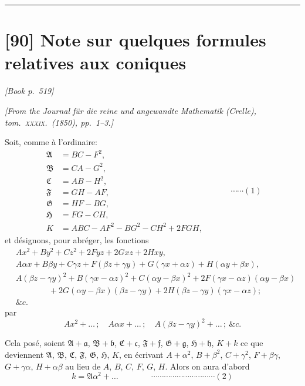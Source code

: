 \documentclass[11pt]{article}
\begin{document}
\bigskip
\hrule
\bigskip


\section*{[90] Note sur quelques formules relatives aux coniques}

\noindent\textit{[Book p.~519]}\hfill

\smallskip

\noindent\emph{[From the Journal f\"ur die reine und angewandte Mathematik (Crelle), tom.~\textsc{xxxix}.\ (1850), pp.~1--3.]}

\medskip

\noindent Soit, comme \`a l'ordinaire:
\[
\begin{aligned}
\mathfrak{A} &= B C - F^{2},\\
\mathfrak{B} &= C A - G^{2},\\
\mathfrak{C} &= A B - H^{2},\\
\mathfrak{F} &= G H - A F,\\
\mathfrak{G} &= H F - B G,\\
\mathfrak{H} &= F G - C H,\\
K &= A B C - A F^{2} - B G^{2} - C H^{2} + 2 F G H,
\end{aligned}\qquad\quad\cdots\cdots (1)
\]
et d\'esignons, pour abr\'eger, les fonctions
\[
\begin{aligned}
& A x^{2} + B y^{2} + C z^{2} + 2 F y z + 2 G x z + 2 H x y,\\
& A \alpha x + B \beta y + C \gamma z + F(\beta z + \gamma y) + G(\gamma x + \alpha z) + H(\alpha y + \beta x),\\
& A(\beta z - \gamma y)^{2} + B(\gamma x - \alpha z)^{2} + C(\alpha y - \beta x)^{2} + 2 F(\gamma x - \alpha z)(\alpha y - \beta x)\\
& \qquad\qquad + 2 G(\alpha y - \beta x)(\beta z - \gamma y) + 2 H(\beta z - \gamma y)(\gamma x - \alpha z);\\
& \&c.
\end{aligned}
\]
par
\[
A x^{2} + \dots\,;\quad A \alpha x + \dots\,;\quad A(\beta z - \gamma y)^{2} + \dots\,;\ \&c.
\]

Cela pos\'e, soient $\mathfrak{A} + \mathfrak{a}$, $\mathfrak{B} + \mathfrak{b}$, $\mathfrak{C} + \mathfrak{c}$, $\mathfrak{F} + \mathfrak{f}$, $\mathfrak{G} + \mathfrak{g}$, $\mathfrak{H} + \mathfrak{h}$, $K + k$ ce que deviennent $\mathfrak{A}$, $\mathfrak{B}$, $\mathfrak{C}$, $\mathfrak{F}$, $\mathfrak{G}$, $\mathfrak{H}$, $K$, en \'ecrivant $A + \alpha^{2}$, $B + \beta^{2}$, $C + \gamma^{2}$, $F + \beta\gamma$, $G + \gamma\alpha$, $H + \alpha\beta$ au lieu de $A$, $B$, $C$, $F$, $G$, $H$. Alors on aura d'abord
\[
k = \mathfrak{A}\alpha^{2} + \dots \qquad\qquad\cdots\cdots\cdots\cdots\cdots\cdots\cdots\cdots\cdots\cdots (2)
\]
\end{document}
